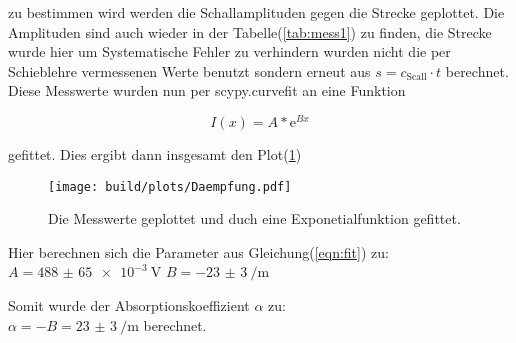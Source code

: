         \noindent zu bestimmen wird werden die Schallamplituden gegen die Strecke geplottet. Die Amplituden sind auch wieder in der 
        Tabelle(\ref{tab:mess1}) zu finden, die Strecke wurde hier um Systematische Fehler zu verhindern wurden nicht die per Schieblehre vermessenen 
        Werte benutzt sondern erneut aus $s = c_{\text{Scall}}\cdot t$ berechnet. Diese Messwerte wurden nun per scypy.curvefit an eine Funktion

        \begin{equation*}
            I(x) = A * \text{e}^{B x}
            \label{eqn:fit}
        \end{equation*}

        \noindent gefittet. Dies ergibt dann insgesamt den Plot(\ref{img:py_daem})

        \begin{figure}[ht]
            \centering
            \texttt{[image: build/plots/Daempfung.pdf]}
            \caption{Die Messwerte geplottet und duch eine Exponetialfunktion gefittet.}
            \label{img:py_daem}
        \end{figure}

        \noindent Hier berechnen sich die Parameter aus Gleichung(\ref{eqn:fit}) zu: \newline
        $A = \SI{488(65)e-3}{\volt}$ \newline
        $B = \SI{-23(3)}{\per\metre}$
        
        \noindent Somit wurde der Absorptionskoeffizient $\alpha$ zu:\\
        $\alpha = -B = \SI{23(3)}{\per\metre} $
        berechnet.

